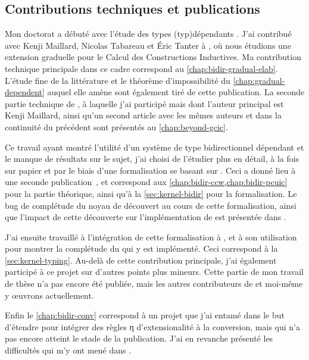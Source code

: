 \subsection{Contributions techniques et publications}

Mon doctorat a débuté avec l’étude des types \kl(typ){dépendants} .
J’ai contribué avec Kenji Maillard, Nicolas Tabareau et Éric Tanter à
, où nous étudions une extension graduelle
pour le Calcul des Constructions Inductives. Ma contribution technique principale
dans ce cadre correspond au \cref{chap:bidir-gradual-elab}.
L’étude fine de la littérature et le théorème d’impossibilité du \cref{chap:gradual-dependent}
auquel elle amène sont également tiré de cette publication.
La seconde partie technique de \textcite{LennonBertrand2022},
à laquelle j’ai participé mais dont l’auteur principal est Kenji Maillard,
ainsi qu’un second article avec les mêmes auteurs et dans la continuité du précédent%
%
sont présentés au \cref{chap:beyond-gcic}.

Ce travail ayant montré l’utilité d’un système de type bidirectionnel dépendant
et le manque de résultats sur le sujet, j’ai choisi de l’étudier
plus en détail, à la fois sur papier et par le biais d’une
formalisation se basant sur .
Ceci a donné lieu à une seconde publication~,
et correspond aux \cref{chap:bidir-ccw,chap:bidir-pcuic} pour la partie théorique,
ainsi qu’à la \cref{sec:kernel-bidir} pour la formalisation.
Le bug de complétude du noyau de  découvert
au cours de cette formalisation, ainsi que l’impact de cette découverte sur
l’implémentation de  est présentée dans .

J’ai ensuite travaillé à l’intégration de cette formalisation à
, et à son utilisation pour montrer la complétude du 
qui y est implémenté.%
Ceci correspond à la \cref{sec:kernel-typing}.
Au-delà de cette contribution principale,
j’ai également participé à ce projet sur d’autres points plus mineurs.
Cette partie de mon travail de thèse n’a pas encore été publiée, mais
les autres contributeurs de  et moi-même y œuvrons actuellement.

Enfin le \cref{chap:bidir-conv} correspond à un projet que j’ai entamé dans
le but d’étendre  pour intégrer des règles η d’extensionalité à la conversion,
mais qui n’a pas encore atteint le stade de la publication. J’ai en revanche
présenté les difficultés qui m’y ont mené dans .